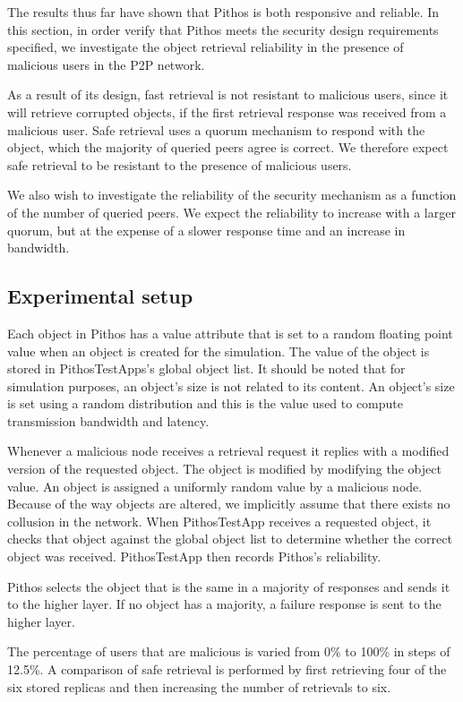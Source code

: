 The results thus far have shown that Pithos is both responsive and reliable. In this section, in order verify that Pithos meets the security design requirements specified, we investigate the object retrieval reliability in the presence of malicious users in the P2P network.

As a result of its design, fast retrieval is not resistant to malicious users, since it will retrieve corrupted objects, if the first retrieval response was received from a malicious user. Safe retrieval uses a quorum mechanism to respond with the object, which the majority of queried peers agree is correct. We therefore expect safe retrieval to be resistant to the presence of malicious users.

We also wish to investigate the reliability of the security mechanism as a function of the number of queried peers. We expect the reliability to increase with a larger quorum, but at the expense of a slower response time and an increase in bandwidth.

\subsection{Experimental setup}

Each object in Pithos has a value attribute that is set to a random floating point value when an object is created for the simulation. The value of the object is stored in PithosTestApps's global object list. It should be noted that for simulation purposes, an object's size is not related to its content. An object's size is set using a random distribution and this is the value used to compute transmission bandwidth and latency.

Whenever a malicious node receives a retrieval request it replies with a modified version of the requested object. The object is modified by modifying the object value. An object is assigned a uniformly random value by a malicious node. Because of the way objects are altered, we implicitly assume that there exists no collusion in the network. When PithosTestApp receives a requested object, it checks that object against the global object list to determine whether the correct object was received. PithosTestApp then records Pithos's reliability.

Pithos selects the object that is the same in a majority of responses and sends it to the higher layer. If no object has a majority, a failure response is sent to the higher layer.

The percentage of users that are malicious is varied from 0\% to 100\% in steps of 12.5\%. A comparison of safe retrieval is performed by first retrieving four of the six stored replicas and then increasing the number of retrievals to six.

